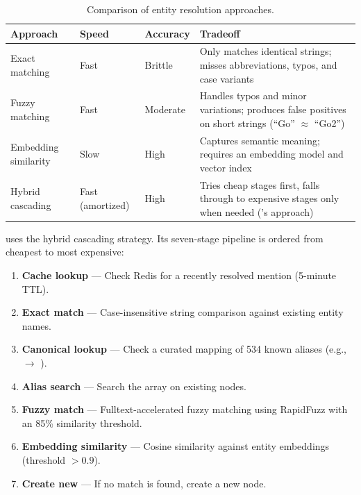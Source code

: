 \begin{table}[ht]
\centering
\caption{Comparison of entity resolution approaches.}
\label{tab:er-approaches}
\begin{tabularx}{\textwidth}{l l l X}
\toprule
\textbf{Approach} & \textbf{Speed} & \textbf{Accuracy} & \textbf{Tradeoff} \\
\midrule
Exact matching      & Fast   & Brittle  & Only matches identical strings;
    misses abbreviations, typos, and case variants \\
Fuzzy matching      & Fast   & Moderate & Handles typos and minor variations;
    produces false positives on short strings (``Go'' $\approx$ ``Go2'') \\
Embedding similarity & Slow  & High     & Captures semantic meaning;
    requires an embedding model and vector index \\
Hybrid cascading    & Fast (amortized) & High & Tries cheap stages first, falls
    through to expensive stages only when needed (\sysname{}'s approach) \\
\bottomrule
\end{tabularx}
\end{table}

\sysname{} uses the hybrid cascading strategy. Its seven-stage pipeline is
ordered from cheapest to most expensive:

\begin{enumerate}
    \item \textbf{Cache lookup} --- Check Redis for a recently resolved
          mention (5-minute TTL).
    \item \textbf{Exact match} --- Case-insensitive string comparison against
          existing entity names.
    \item \textbf{Canonical lookup} --- Check a curated mapping of 534 known
          aliases (e.g.,  $\to$ ).
    \item \textbf{Alias search} --- Search the  array on existing
           nodes.
    \item \textbf{Fuzzy match} --- Fulltext-accelerated fuzzy matching using
          RapidFuzz with an 85\% similarity threshold.
    \item \textbf{Embedding similarity} --- Cosine similarity against entity
          embeddings (threshold $> 0.9$).
    \item \textbf{Create new} --- If no match is found, create a new
           node.
\end{enumerate}

